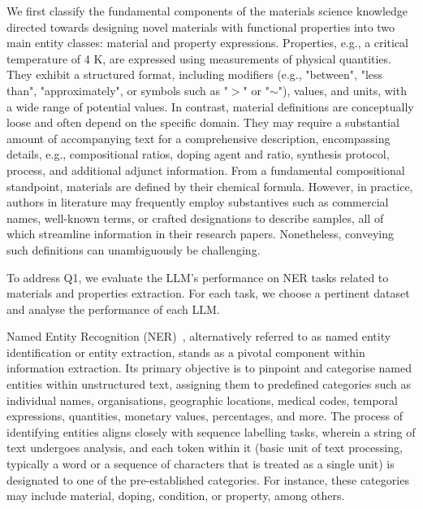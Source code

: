 \vspace{.1cm}
We first classify the fundamental components of the materials science knowledge directed towards designing novel materials with functional properties into two main entity classes: material and property expressions. 
Properties, e.g., a critical temperature of 4 K, are expressed using measurements of physical quantities. 
They exhibit a structured format, including modifiers (e.g., "between", "less than", "approximately", or symbols such as "$>$" or "$\sim$"), values, and units, with a wide range of potential values. 
In contrast, material definitions are conceptually loose and often depend on the specific domain. They may require a substantial amount of accompanying text for a comprehensive description, encompassing details, e.g., compositional ratios, doping agent and ratio, synthesis protocol, process, and additional adjunct information. 
From a fundamental compositional standpoint, materials are defined by their chemical formula. However, in practice, authors in literature may frequently employ substantives such as commercial names, well-known terms, or crafted designations to describe samples, all of which streamline information in their research papers. Nonetheless, conveying such definitions can unambiguously be challenging.

To address Q1, we evaluate the LLM's performance on NER tasks related to materials and properties extraction. For each task, we choose a pertinent dataset and analyse the performance of each LLM.

Named Entity Recognition (NER)~\cite{nadeau2007survey}, alternatively referred to as named entity identification or entity extraction, stands as a pivotal component within information extraction. Its primary objective is to pinpoint and categorise named entities within unstructured text, assigning them to predefined categories such as individual names, organisations, geographic locations, medical codes, temporal expressions, quantities, monetary values, percentages, and more. The process of identifying entities aligns closely with sequence labelling tasks, wherein a string of text undergoes analysis, and each token within it (basic unit of text processing, typically a word or a sequence of characters that is treated as a single unit) is designated to one of the pre-established categories. For instance, these categories may include material, doping, condition, or property, among others.



